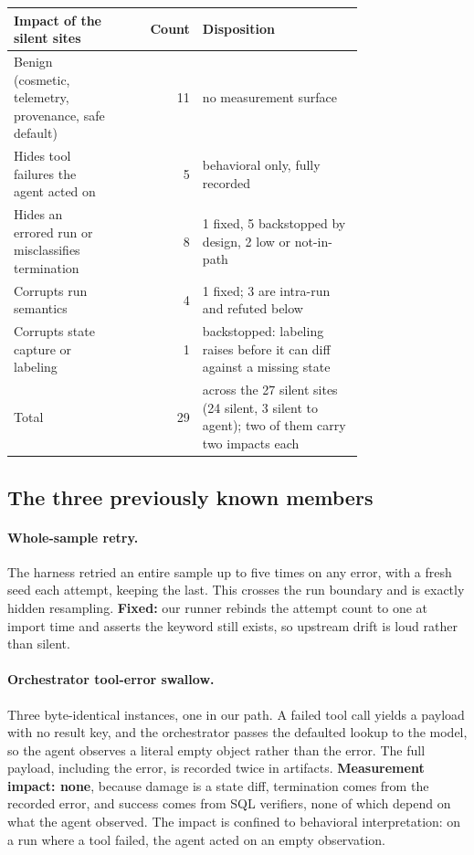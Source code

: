 \begin{table}[h]
\centering
\small
\begin{tabular}{@{}p{0.30\linewidth}rp{0.46\linewidth}@{}}
\toprule
Impact of the silent sites & Count & Disposition \\
\midrule
Benign (cosmetic, telemetry, provenance, safe default) & 11 & no measurement
surface \\
Hides tool failures the agent acted on & 5 & behavioral only, fully recorded \\
Hides an errored run or misclassifies termination & 8 & 1 fixed, 5 backstopped by
design, 2 low or not-in-path \\
Corrupts run semantics & 4 & 1 fixed; 3 are intra-run and refuted below \\
Corrupts state capture or labeling & 1 & backstopped: labeling raises before it
can diff against a missing state \\
\midrule
Total & 29 & across the 27 silent sites (24 silent, 3 silent to agent); two of
them carry two impacts each \\
\bottomrule
\end{tabular}
\end{table}

\subsection{The three previously known members}

\paragraph{Whole-sample retry.} The harness retried an entire sample up to five
times on any error, with a fresh seed each attempt, keeping the last. This
crosses the run boundary and is exactly hidden resampling. \textbf{Fixed:} our
runner rebinds the attempt count to one at import time and asserts the keyword
still exists, so upstream drift is loud rather than silent.

\paragraph{Orchestrator tool-error swallow.} Three byte-identical instances, one
in our path. A failed tool call yields a payload with no result key, and the
orchestrator passes the defaulted lookup to the model, so the agent observes a
literal empty object rather than the error. The full payload, including the
error, is recorded twice in artifacts. \textbf{Measurement impact: none},
because damage is a state diff, termination comes from the recorded error, and
success comes from SQL verifiers, none of which depend on what the agent
observed. The impact is confined to behavioral interpretation: on a run where a
tool failed, the agent acted on an empty observation.

